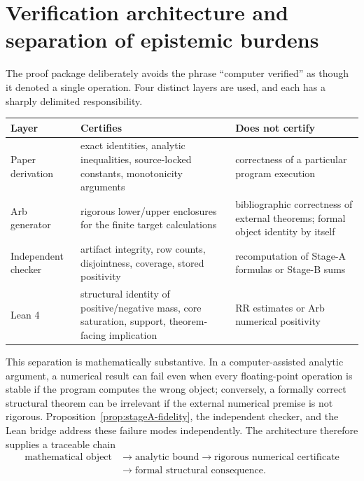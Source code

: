 \documentclass[11pt]{article}
\theoremstyle{definition}
\begin{document}
\section{Verification architecture and separation of epistemic burdens}\label{sec:verification}

The proof package deliberately avoids the phrase ``computer verified'' as though it denoted a single operation. Four distinct layers are used, and each has a sharply delimited responsibility.

\begin{center}
\begin{tabular}{p{}p{}p{}}
\toprule
Layer & Certifies & Does not certify\\
\midrule
Paper derivation & exact identities, analytic inequalities, source-locked constants, monotonicity arguments & correctness of a particular program execution\\
Arb generator & rigorous lower/upper enclosures for the finite target calculations & bibliographic correctness of external theorems; formal object identity by itself\\
Independent checker & artifact integrity, row counts, disjointness, coverage, stored positivity & recomputation of Stage-A formulas or Stage-B sums\\
Lean 4 & structural identity of positive/negative mass, core saturation, support, theorem-facing implication & RR estimates or Arb numerical positivity\\
\bottomrule
\end{tabular}
\end{center}

This separation is mathematically substantive. In a computer-assisted analytic argument, a numerical result can fail even when every floating-point operation is stable if the program computes the wrong object; conversely, a formally correct structural theorem can be irrelevant if the external numerical premise is not rigorous. Proposition~\ref{prop:stageA-fidelity}, the independent checker, and the Lean bridge address these failure modes independently. The architecture therefore supplies a traceable chain
\[
\begin{aligned}
\text{mathematical object}&\longrightarrow\text{analytic bound}
\longrightarrow\text{rigorous numerical certificate}\\
&\longrightarrow\text{formal structural consequence}.
\end{aligned}
\]
\end{document}
